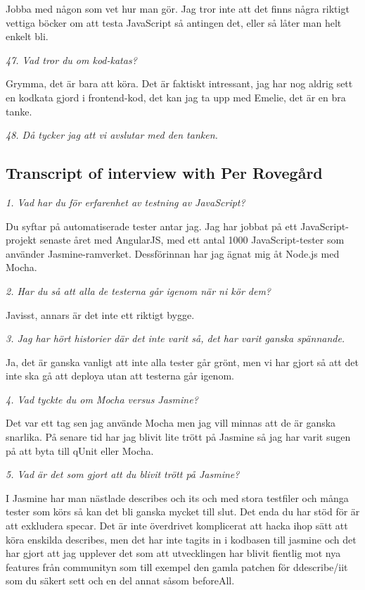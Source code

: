 \documentclass[11pt]{article}
\begin{document}
Jobba med någon som vet hur man gör. Jag tror inte att det finns några riktigt vettiga böcker om att testa JavaScript så antingen det, eller så låter man helt enkelt bli.

\emph{47. Vad tror du om kod-katas?}

Grymma, det är bara att köra. Det är faktiskt intressant, jag har nog aldrig sett en kodkata gjord i frontend-kod, det kan jag ta upp med Emelie, det är en bra tanke.

\emph{48. Då tycker jag att vi avslutar med den tanken.}


\subsection*{Transcript of interview with Per Rovegård}

\emph{1. Vad har du för erfarenhet av testning av JavaScript?}

Du syftar på automatiserade tester antar jag. Jag har jobbat på ett JavaScript-projekt senaste året med AngularJS, med ett antal 1000 JavaScript-tester som använder Jasmine-ramverket. Dessförinnan har jag ägnat mig åt Node.js med Mocha.

\emph{2. Har du så att alla de testerna går igenom när ni kör dem?}

Javisst, annars är det inte ett riktigt bygge.

\emph{3. Jag har hört historier där det inte varit så, det har varit ganska spännande.}

Ja, det är ganska vanligt att inte alla tester går grönt, men vi har gjort så att det inte ska gå att deploya utan att testerna går igenom.

\emph{4. Vad tyckte du om Mocha versus Jasmine?}

Det var ett tag sen jag använde Mocha men jag vill minnas att de är ganska snarlika. På senare tid har jag blivit lite trött på Jasmine så jag har varit sugen på att byta till qUnit eller Mocha.

\emph{5. Vad är det som gjort att du blivit trött på Jasmine?}

I Jasmine har man nästlade describes och its och med stora testfiler och många tester som körs så kan det bli ganska mycket till slut. Det enda du har stöd för är att exkludera specar. Det är inte överdrivet komplicerat att hacka ihop sätt att köra enskilda describes, men det har inte tagits in i kodbasen till jasmine och det har gjort att jag upplever det som att utvecklingen har blivit fientlig mot nya features från communityn som till exempel den gamla patchen för ddescribe/iit som du säkert sett och en del annat såsom beforeAll.
\end{document}
